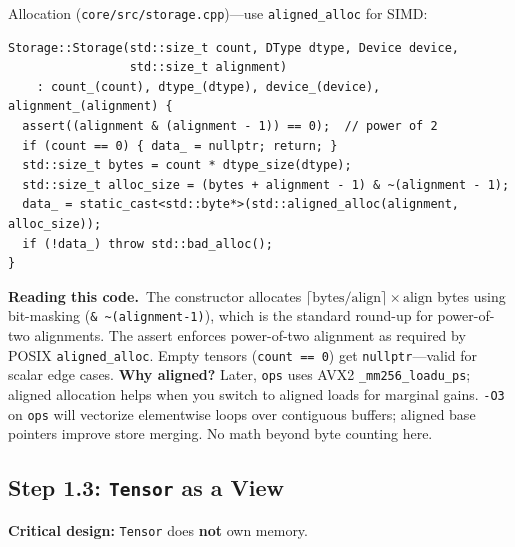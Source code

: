 \documentclass[11pt,a4paper]{article}
\newcommand{\explain}{\par\smallskip\noindent}
\newcommand{\exhead}{\textbf{Reading this code.}\ }
\begin{document}
Allocation (\texttt{core/src/storage.cpp})---use \texttt{aligned\_alloc} for SIMD:
\begin{lstlisting}[style=cpp]
Storage::Storage(std::size_t count, DType dtype, Device device,
                 std::size_t alignment)
    : count_(count), dtype_(dtype), device_(device), alignment_(alignment) {
  assert((alignment & (alignment - 1)) == 0);  // power of 2
  if (count == 0) { data_ = nullptr; return; }
  std::size_t bytes = count * dtype_size(dtype);
  std::size_t alloc_size = (bytes + alignment - 1) & ~(alignment - 1);
  data_ = static_cast<std::byte*>(std::aligned_alloc(alignment, alloc_size));
  if (!data_) throw std::bad_alloc();
}
\end{lstlisting}
\explain\exhead The constructor allocates $\lceil \text{bytes} / \text{align} \rceil \times
\text{align}$ bytes using bit-masking (\texttt{\& \textasciitilde(alignment-1)}), which is the
standard round-up for power-of-two alignments. The assert enforces power-of-two alignment as
required by POSIX \texttt{aligned\_alloc}. Empty tensors (\texttt{count == 0}) get
\texttt{nullptr}---valid for scalar edge cases. \textbf{Why aligned?} Later, \texttt{ops} uses
AVX2 \texttt{\_mm256\_loadu\_ps}; aligned allocation helps when you switch to aligned loads
for marginal gains. \texttt{-O3} on \texttt{ops} will vectorize elementwise loops over
contiguous buffers; aligned base pointers improve store merging. No math beyond byte counting
here.

\subsection{Step 1.3: \texttt{Tensor} as a View}

\textbf{Critical design:} \texttt{Tensor} does \textbf{not} own memory.
\end{document}
